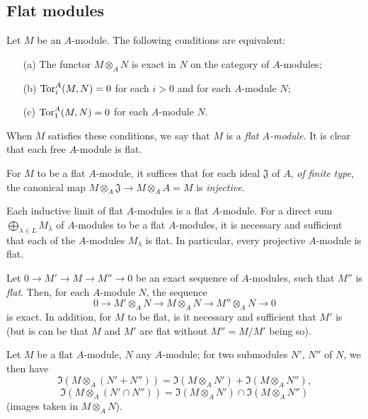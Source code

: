 \subsection{Flat modules}
\label{subsection-flat-modules}

\begin{env}[6.1.1]
\label{env-0.6.1.1}
Let $M$ be an $A$-module. The following conditions are equivalent:
\begin{itemize}
  \item[(a)] The functor $M\otimes_A N$ is exact in $N$ on the category of $A$-modules;
  \item[(b)] ${\mathop{\mathrm{Tor}}\nolimits}_i^A(M,N)=0$ for each $i>0$ and for each $A$-module $N$;
  \item[(c)] ${\mathop{\mathrm{Tor}}\nolimits}_1^A(M,N)=0$ for each $A$-module $N$.
\end{itemize}

When $M$ satisfies these conditions, we say that $M$ is a
{\em flat $A$-module}. It is clear that each free $A$-module is flat.

For $M$ to be a flat $A$-module, it suffices that for each ideal $\mathfrak{J}$
of $A$, {\em of finite type}, the canonical map
$M\otimes_A\mathfrak{J}\to M\otimes_A A=M$ is {\em injective}.
\end{env}

\begin{env}[6.1.2]
\label{env-0.6.1.2}
Each inductive limit of flat $A$-modules is a flat $A$-module. For a direct sum
$\bigoplus_{\lambda\in L}M_\lambda$ of $A$-modules to be a flat $A$-modules, it
is necessary and sufficient that each of the $A$-modules $M_\lambda$ is flat. In
particular, every projective $A$-module is flat.

Let $0\to M'\to M\to M''\to 0$ be an exact sequence of $A$-modules, such that
$M''$ is {\em flat}. Then, for each $A$-module $N$, the sequence
\[
  0\longrightarrow M'\otimes_A N\longrightarrow M\otimes_A N
  \longrightarrow M''\otimes_A N\longrightarrow 0
\]
is exact. In addition, for $M$ to be flat, is it necessary and sufficient that
$M'$ is (but is can be that $M$ and $M'$ are flat without $M''=M/M'$ being so).
\end{env}

\begin{env}[6.1.3]
\label{env-0.6.1.3}
Let $M$ be a flat $A$-module, $N$ any $A$-module; for two submodules $N'$, $N''$
of $N$, we then have
\[
  \Im(M\otimes_A(N'+N''))=\Im(M\otimes_A N')+\Im(M\otimes_A N''),
\]
\[
  \Im(M\otimes_A(N'\cap N''))=\Im(M\otimes_A N')\cap\Im(M\otimes_A N'')
\]
(images taken in $M\otimes_A N$).
\end{env}

